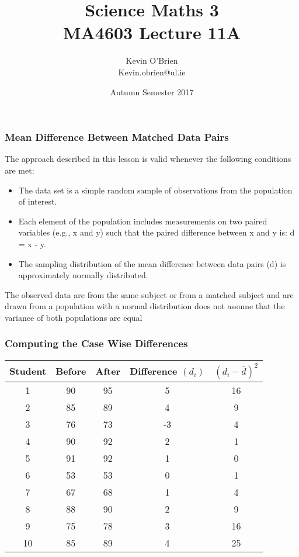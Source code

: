 \documentclass[a4]{beamer}
\title[MA4603]{Science Maths 3 \\ {\normalsize MA4603 Lecture 11A}}
\author[Kevin O'Brien]{Kevin O'Brien \\ {\scriptsize Kevin.obrien@ul.ie}}
\date{Autumn Semester 2017}
\institute[Maths \& Stats]{Dept. of Mathematics \& Statistics, \\ University \textit{of} Limerick}
\begin{document}

\begin{frame}
\frametitle{Mean Difference Between Matched Data Pairs}


The approach described in this lesson is valid whenever the following conditions are met:

\begin{itemize}
\item The data set is a simple random sample of observations from the population of interest.
\item Each element of the population includes measurements on two paired variables (e.g., x and y) such that the paired difference between x and y is: d = x - y.
\item The sampling distribution of the mean difference between data pairs (d) is approximately normally distributed.
\end{itemize}



The observed data are from the same subject or from a matched subject and are drawn from a population with a normal distribution
does not assume that the variance of both populations are equal



\end{frame}

\begin{frame}
\frametitle{Computing the Case Wise Differences}
\begin{center}
\small
\begin{tabular}{|c||c|c|c|c|} \hline
Student & Before & After & Difference $(d_i)$ & $ (d_i -\bar{d})^2$ \\\hline
1 &90& 95& 5& 16 \\\hline
2 &85& 89& 4& 9 \\\hline
3 &76 &73 &-3 &4 \\\hline
4 &90& 92& 2& 1 \\\hline
5 &91 &92 &1 &0 \\\hline
6 &53 &53& 0& 1 \\\hline
7 &67 &68 &1 &4 \\\hline
8 &88 &90 &2 &9 \\\hline
9 &75 &78 &3 &16\\\hline
10 &85& 89 &4& 25 \\\hline
\end{tabular}
\end{center}

\end{frame}
\end{document}
